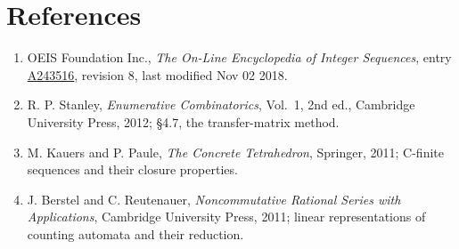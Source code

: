 \documentclass[11pt]{article}
\theoremstyle{definition}
\begin{document}
\section{References}

\begin{enumerate}

\item OEIS Foundation Inc., \emph{The On-Line Encyclopedia of Integer Sequences}, entry \href{https://oeis.org/A243516}{A243516}, revision 8, last modified Nov 02 2018.

\item R. P. Stanley, \emph{Enumerative Combinatorics}, Vol.~1, 2nd ed., Cambridge University Press, 2012; \S4.7, the transfer-matrix method.

\item M. Kauers and P. Paule, \emph{The Concrete Tetrahedron}, Springer, 2011; C-finite sequences and their closure properties.

\item J. Berstel and C. Reutenauer, \emph{Noncommutative Rational Series with Applications}, Cambridge University Press, 2011; linear representations of counting automata and their reduction.

\end{enumerate}
\end{document}
